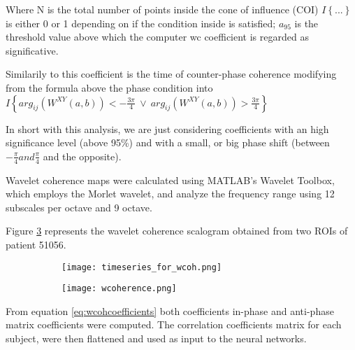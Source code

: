 \documentclass[a4paper,11pt]{article}
\begin{document}
Where N is the total number of points inside the cone of influence (COI) $I\left\{ ...\right\}$ is either 0 or 1 depending on if the condition inside is satisfied; $a_{95}$ is the threshold value above which the computer wc coefficient is regarded as significative.

Similarily to this coefficient is the time of counter-phase coherence modifying from the formula above the phase condition into $I\left\{arg_{ij}(W^{XY}(a, b)) < -\frac{3\pi}{4} \ \lor \ arg_{ij}(W^{XY}(a, b)) >\frac{3\pi}{4}  \right\}$

In short with this analysis, we are just considering coefficients with an high significance level (above 95\%) and with a small, or big phase shift (between $-\frac{\pi}{4} and \frac{\pi}{4}$ and the opposite).

Wavelet coherence maps were calculated using MATLAB's Wavelet Toolbox, which employs the Morlet wavelet, and analyze the frequency range using 12 subscales per octave and 9 octave.

Figure \ref{fig:wcoherence} represents the wavelet coherence scalogram obtained from two ROIs of patient 51056.



\begin{figure}
\begin{subfigure}{0.5\textwidth}
\texttt{[image: timeseries\_for\_wcoh.png]}
\caption{}
\label{fig:wcoherence1}
\end{subfigure}
\begin{subfigure}{0.5\textwidth}
\texttt{[image: wcoherence.png]}
\caption{}
\label{fig:wcoherence2}
\end{subfigure}
\caption{}
\label{fig:wcoherence}
\end{figure}



From equation \ref{eq:wcohcoefficients} both coefficients in-phase and anti-phase matrix coefficients were computed.
The correlation coefficients matrix for each subject, were then flattened and used as input to the neural networks.
\end{document}
